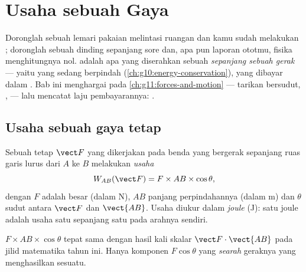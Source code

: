 \chapter{Usaha sebuah Gaya}\label{ch:g11:work-of-force}

Doronglah sebuah lemari pakaian melintasi ruangan dan kamu sudah
melakukan ; doronglah sebuah dinding sepanjang sore dan, apa pun
laporan ototmu, fisika menghitungnya nol.  adalah apa yang
diserahkan sebuah  \emph{sepanjang sebuah gerak} --- yaitu 
yang sedang berpindah (\cref{ch:g10:energy-conservation}), yang dibayar
dalam . Bab ini menghargai  pada
\cref{ch:g11:forces-and-motion} --- tarikan bersudut, ,  ---
lalu mencatat laju pembayarannya: .

\section{Usaha sebuah gaya tetap}

\begin{definition}\label{def:g11:work-of-force:work}
Sebuah  tetap $\vect F$ yang dikerjakan pada benda yang bergerak
sepanjang ruas garis lurus dari $A$ ke $B$ melakukan
\emph{usaha}
\[
W_{AB}(\vect F) = F \times AB \times \cos\theta ,
\]
dengan $F$ adalah besar  (dalam \unit{N}), $AB$ panjang
perpindahannya (dalam \unit{m}) dan $\theta$ sudut antara $\vect F$ dan
$\vect{AB}$. Usaha diukur dalam \emph{joule} (\unit{J}):
satu joule adalah usaha  satu  sepanjang satu  pada
arahnya sendiri.
\end{definition}

\begin{remark}\label{rem:g11:work-of-force:scal}
$F \times AB \times \cos\theta$ tepat sama dengan hasil kali skalar
$\vect F \cdot \vect{AB}$ pada jilid matematika tahun ini. Hanya
komponen $F\cos\theta$ yang \emph{searah} geraknya yang menghasilkan
sesuatu.
\end{remark}

